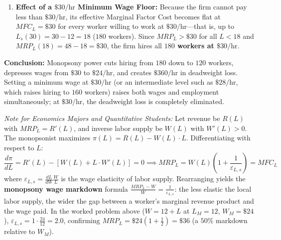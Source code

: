 \documentclass[11pt,letterpaper]{article}
\begin{document}
\begin{tcolorbox}[colback=CourseBlue!5!white,colframe=CourseBlue!80!black,title=\textbf{Work It Out: Monopsony Hiring, Deadweight Loss, and a Minimum Wage Floor}]
\begin{enumerate}
    \item \textbf{Effect of a $\$30/\text{hr}$ Minimum Wage Floor:}
    Because the firm cannot pay less than $\$30/\text{hr}$, its effective Marginal Factor Cost becomes flat at $MFC_L = \$30$ for every worker willing to work at $\$30/\text{hr}$---that is, up to $L_s(30) = 30 - 12 = 18$ ($180$ workers). Since $MRP_L > \$30$ for all $L < 18$ and $MRP_L(18) = 48 - 18 = \$30$, the firm hires all \textbf{$180$ workers at $\$30/\text{hr}$}.
\end{enumerate}
\textbf{Conclusion:} Monopsony power cuts hiring from $180$ down to $120$ workers, depresses wages from $\$30$ to $\$24/\text{hr}$, and creates $\$360/\text{hr}$ in deadweight loss. Setting a minimum wage at $\$30/\text{hr}$ (or an intermediate level such as $\$28/\text{hr}$, which raises hiring to $160$ workers) raises both wages and employment simultaneously; at $\$30/\text{hr}$, the deadweight loss is completely eliminated.
\end{tcolorbox}

\begin{tcolorbox}[colback=SlateBlue!5!white,colframe=SlateBlue!85!black,title=\textbf{Optional Advanced Section: Calculus of Monopsony Optimization}]
\small
\emph{Note for Economics Majors and Quantitative Students:}
Let revenue be $R(L)$ with $MRP_L = R'(L)$, and inverse labor supply be $W(L)$ with $W'(L) > 0$. The monopsonist maximizes $\pi(L) = R(L) - W(L) \cdot L$. Differentiating with respect to $L$:
\[
\frac{d\pi}{dL} = R'(L) - \left[ W(L) + L \cdot W'(L) \right] = 0 \implies MRP_L = W(L)\!\left( 1 + \frac{1}{\varepsilon_{L,s}} \right) = MFC_L
\]
where $\varepsilon_{L,s} = \frac{dL}{dW}\frac{W}{L}$ is the wage elasticity of labor supply. Rearranging yields the \textbf{monopsony wage markdown} formula $\frac{MRP_L - W}{W} = \frac{1}{\varepsilon_{L,s}}$: the less elastic the local labor supply, the wider the gap between a worker's marginal revenue product and the wage paid. In the worked problem above ($W = 12 + L$ at $L_M = 12$, $W_M = \$24$), $\varepsilon_{L,s} = 1 \cdot \frac{24}{12} = 2.0$, confirming $MRP_L = \$24(1 + \frac{1}{2}) = \$36$ (a $50\%$ markdown relative to $W_M$).
\end{tcolorbox}
\end{document}
